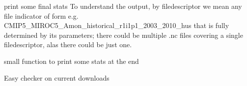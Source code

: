\documentclass[letterpaper,10pt,english]{sphinxmanual}
\begin{document}
\begin{fulllineitems}
\label{\detokenize{index:cmip5datafinder.print_final_stats}}
print some final stats
To understand the output, by filedescriptor we mean any file indicator
of form e.g. CMIP5\_MIROC5\_Amon\_historical\_r1i1p1\_2003\_2010\_hus that is fully
determined by its parameters; there could be multiple .nc files
covering a single filedescriptor, alas there could be just one.

\end{fulllineitems}


\begin{fulllineitems}
\label{\detokenize{index:cmip5datafinder.print_stats}}
small function to print some stats at the end

\end{fulllineitems}


\begin{fulllineitems}
\label{\detokenize{index:cmip5datafinder.synda_check_dll}}
Easy checker on current downloads

\end{fulllineitems}

\end{document}
